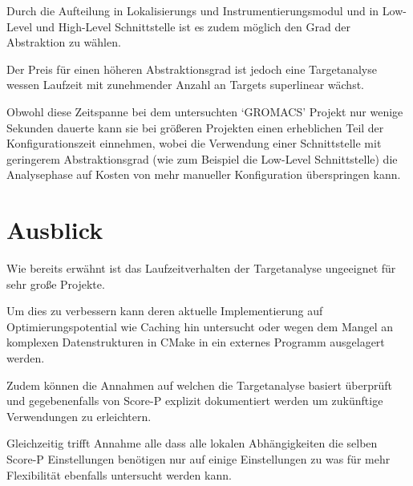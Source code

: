 \documentclass[german,proseminar,hyperref,utf8]{zihpub}
\begin{document}
    Durch die Aufteilung in Lokalisierungs und Instrumentierungsmodul und in Low-Level und High-Level
    Schnittstelle ist es zudem möglich den Grad der Abstraktion zu wählen.

    Der Preis für einen höheren Abstraktionsgrad ist jedoch eine Targetanalyse wessen Laufzeit
    mit zunehmender Anzahl an Targets superlinear wächst.

    Obwohl diese Zeitspanne bei dem untersuchten `GROMACS' Projekt nur wenige Sekunden dauerte
    kann sie bei grö{\ss}eren Projekten einen erheblichen Teil der Konfigurationszeit einnehmen, wobei
    die Verwendung einer Schnittstelle mit geringerem Abstraktionsgrad (wie zum Beispiel die Low-Level
    Schnittstelle) die Analysephase auf Kosten von mehr manueller Konfiguration überspringen kann.


    \section{Ausblick}
    Wie bereits erwähnt ist das Laufzeitverhalten der Targetanalyse ungeeignet für sehr gro{\ss}e Projekte.

    Um dies zu verbessern kann deren aktuelle Implementierung auf Optimierungspotential wie Caching
    hin untersucht oder wegen dem Mangel an komplexen Datenstrukturen in CMake in ein externes
    Programm ausgelagert werden.

    Zudem können die Annahmen auf welchen die Targetanalyse basiert überprüft und gegebenenfalls von
    Score-P explizit dokumentiert werden um zukünftige Verwendungen zu erleichtern.
    
    Gleichzeitig trifft Annahme alle dass alle lokalen Abhängigkeiten die selben Score-P Einstellungen
    benötigen nur auf einige Einstellungen zu was für mehr Flexibilität ebenfalls untersucht werden kann.

    \newpage
    \listoffigures
\end{document}
